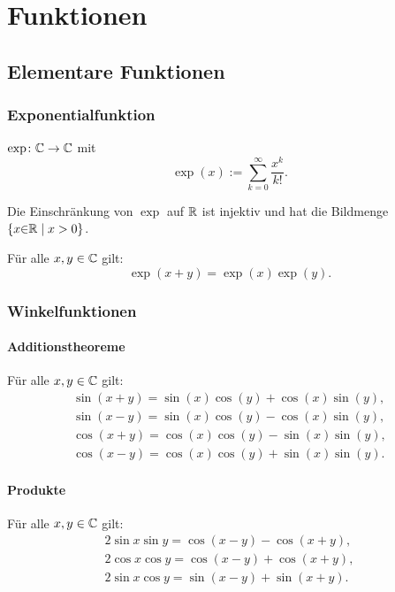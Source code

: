 
\chapter{Funktionen}
\section{Elementare Funktionen}
\subsection{Exponentialfunktion}
\begin{Definition}
$\exp\colon\mathbb C\to\mathbb C$ mit
\begin{equation}
\exp(x) := \sum_{k=0}^{\infty} \frac{x^k}{k!}.
\end{equation}
\end{Definition}
\noindent
Die Einschränkung von $\exp$ auf $\mathbb R$ ist injektiv und
hat die Bildmenge $\{x{\in}\mathbb R\mid x>0\}$.

Für alle $x,y\in\mathbb C$ gilt:
\begin{equation}
\exp(x+y) = \exp(x)\exp(y).
\end{equation}

\subsection{Winkelfunktionen}
\subsubsection{Additionstheoreme}

Für alle $x,y\in\mathbb C$ gilt:
\begin{gather}
\sin(x+y) = \sin(x)\cos(y)+\cos(x)\sin(y),\\
\sin(x-y) = \sin(x)\cos(y)-\cos(x)\sin(y),\\
\cos(x+y) = \cos(x)\cos(y)-\sin(x)\sin(y),\\
\cos(x-y) = \cos(x)\cos(y)+\sin(x)\sin(y).
\end{gather}

\subsubsection{Produkte}
Für alle $x,y\in\mathbb C$ gilt:
\begin{gather}
2\sin x\sin y = \cos(x-y)-\cos(x+y),\\
2\cos x\cos y = \cos(x-y)+\cos(x+y),\\
2\sin x\cos y = \sin(x-y)+\sin(x+y).
\end{gather}
